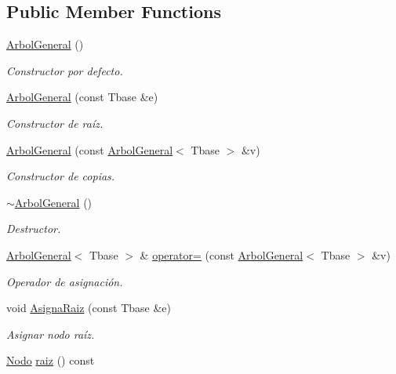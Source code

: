 \subsection*{Public Member Functions}
\begin{DoxyCompactItemize}
\item 
\hyperlink{class_arbol_general_a2c792965befd8644246118a09a10123c}{Arbol\+General} ()
\begin{DoxyCompactList}\small\item\em Constructor por defecto. \end{DoxyCompactList}\item 
\hyperlink{class_arbol_general_a8ddac1a024f05bee96f4c259fad76c4c}{Arbol\+General} (const Tbase \&e)
\begin{DoxyCompactList}\small\item\em Constructor de raíz. \end{DoxyCompactList}\item 
\hyperlink{class_arbol_general_ad7926f03eb051b9691d57f4e508cad4d}{Arbol\+General} (const \hyperlink{class_arbol_general}{Arbol\+General}$<$ Tbase $>$ \&v)
\begin{DoxyCompactList}\small\item\em Constructor de copias. \end{DoxyCompactList}\item 
\hyperlink{class_arbol_general_a085c45825063913fb958b704f59033f3}{$\sim$\+Arbol\+General} ()
\begin{DoxyCompactList}\small\item\em Destructor. \end{DoxyCompactList}\item 
\hyperlink{class_arbol_general}{Arbol\+General}$<$ Tbase $>$ \& \hyperlink{class_arbol_general_aebd3723e9929b905445127a754a26759}{operator=} (const \hyperlink{class_arbol_general}{Arbol\+General}$<$ Tbase $>$ \&v)
\begin{DoxyCompactList}\small\item\em Operador de asignación. \end{DoxyCompactList}\item 
void \hyperlink{class_arbol_general_a84781986cd57390540600494303b0e9d}{Asigna\+Raiz} (const Tbase \&e)
\begin{DoxyCompactList}\small\item\em Asignar nodo raíz. \end{DoxyCompactList}\item 
\hyperlink{class_arbol_general_a12cc1b74a9095d89bc7334290d332f7a}{Nodo} \hyperlink{class_arbol_general_ae33520448eb3f38a597b8c27579b5ec8}{raiz} () const 

\end{DoxyCompactItemize}
